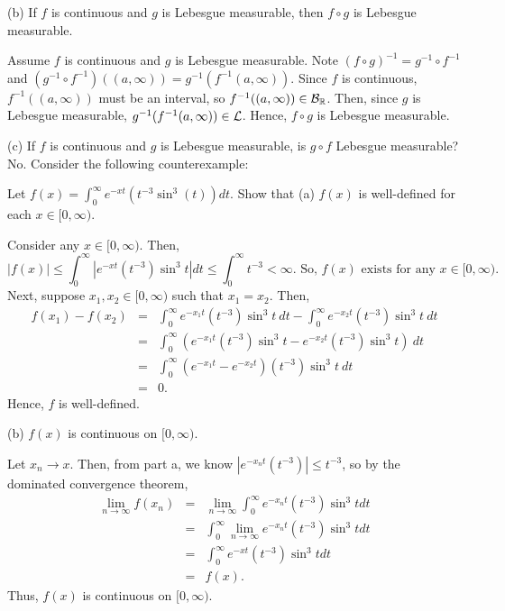 \begin{list}
(b) If $f$ is continuous and $g$ is Lebesgue measurable, then $f \circ g$ is Lebesgue measurable. 
\begin{pf}
Assume $f$ is continuous and $g$ is Lebesgue measurable. Note $(f \circ g)^{-1}=g^{-1} \circ f^{-1}$ and
$
(g^{-1} \circ f^{-1})((a,\infty )) = g^{-1}(f^{-1}(a,\infty )).
$
Since $f$ is continuous, $f^{-1}((a,\infty))$ must be an interval, so $f^{-1}((a,\infty )) \in {\mathcal B}_{\mathbb R}$. Then, since $g$ is Lebesgue measurable,  $g^{-1}(f^{-1}(a, \infty)) \in {\mathcal L} $. Hence, $f \circ g$ is Lebesgue measurable. 
\end{pf}

(c) If $f$ is continuous and $g$ is Lebesgue measurable, is $g \circ f$ Lebesgue measurable? \\
No. Consider the following counterexample: \\


\item Let $f(x) = \int_0^\infty e^{-xt}(t^{-3}\sin^3(t))dt$. Show that
(a) $f(x)$ is well-defined for each $x \in [0, \infty)$. 
\begin{pf}
Consider any $x \in [0, \infty)$. Then, \[
|f(x)| \leq \int_0^\infty |e^{-xt}(t^{-3})\sin^3t| dt \leq \int_0^\infty t^{-3} < \infty. \text{ So, } f(x) \text{ exists for any } x \in [0, \infty).
\]	
Next, suppose $x_1, x_2 \in [0, \infty)$ such that $x_1 = x_2$. Then, 
\begin{eqnarray*}
f(x_1) - f(x_2) & = & \int_0^\infty e^{-x_1t}(t^{-3})\sin^3t \ dt - \int_0^\infty e^{-x_2t}(t^{-3})\sin^3t \ dt \\
& = & \int_0^\infty (e^{-x_1t}(t^{-3})\sin^3t - e^{-x_2t}(t^{-3})\sin^3t) \ dt \\
& = & \int_0^\infty (e^{-x_1t}- e^{-x_2t})(t^{-3})\sin^3t \ dt \\
& =& 0.
\end{eqnarray*}
Hence, $f$ is well-defined.
\end{pf}
(b) $f(x)$ is continuous on $[0, \infty)$.
\begin{pf}
Let $x_n \rightarrow x$. Then, from part a, we know $|e^{-x_nt}(t^{-3})| \leq t^{-3}$, so by the dominated convergence theorem, 
\begin{eqnarray*}
\lim_{n \rightarrow \infty}f(x_n) & = & \lim_{n \rightarrow \infty}	 \int_0^\infty e^{-x_nt}(t^{-3})\sin^3t dt \\
& = &  \int_0^\infty \lim_{n \rightarrow \infty}	 e^{-x_nt}(t^{-3})\sin^3t dt \\
& = &  \int_0^\infty  e^{-xt}(t^{-3})\sin^3t dt \\
& = & f(x).
\end{eqnarray*}
	Thus, $f(x)$ is continuous on $[0, \infty)$. 
\end{pf}


\end{list}
